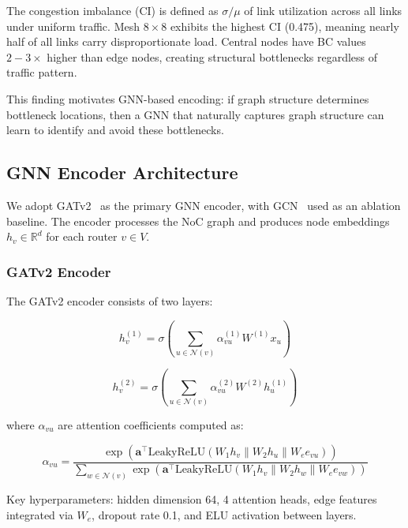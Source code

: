 The congestion imbalance (CI) is defined as $\sigma/\mu$ of link utilization across all links under uniform traffic. Mesh $8\times8$ exhibits the highest CI (0.475), meaning nearly half of all links carry disproportionate load. Central nodes have BC values $2-3\times$ higher than edge nodes, creating structural bottlenecks regardless of traffic pattern.

This finding motivates GNN-based encoding: if graph structure determines bottleneck locations, then a GNN that naturally captures graph structure can learn to identify and avoid these bottlenecks.

\subsection{GNN Encoder Architecture}

We adopt GATv2~\cite{gatv2} as the primary GNN encoder, with GCN~\cite{gcn2017} used as an ablation baseline. The encoder processes the NoC graph and produces node embeddings $h_v \in \mathbb{R}^{d}$ for each router $v \in V$.

\subsubsection{GATv2 Encoder}

The GATv2 encoder consists of two layers:

\begin{equation}
h_v^{(1)} = \sigma\left( \sum_{u \in \mathcal{N}(v)} \alpha_{vu}^{(1)} W^{(1)} x_u \right)
\end{equation}

\begin{equation}
h_v^{(2)} = \sigma\left( \sum_{u \in \mathcal{N}(v)} \alpha_{vu}^{(2)} W^{(2)} h_u^{(1)} \right)
\end{equation}

where $\alpha_{vu}$ are attention coefficients computed as:

\begin{equation}
\alpha_{vu} = \frac{\exp\left( \mathbf{a}^{\top} \text{LeakyReLU}\left( W_1 h_v \| W_2 h_u \| W_e e_{vu} \right) \right)}{\sum_{w \in \mathcal{N}(v)} \exp\left( \mathbf{a}^{\top} \text{LeakyReLU}\left( W_1 h_v \| W_2 h_w \| W_e e_{vw} \right) \right)}
\end{equation}

Key hyperparameters: hidden dimension 64, 4 attention heads, edge features integrated via $W_e$, dropout rate 0.1, and ELU activation between layers.

